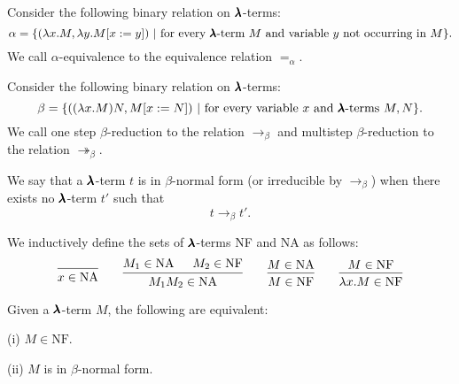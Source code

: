 \begin{definition}
  Consider the following binary relation on $\pmb{\lambda}$-terms:  
  \[
    \alpha = \{ (\lambda x . M, \lambda y . M[x := y]) \
                | \ \text{for every $\pmb{\lambda}$-term $M$ and variable $y$ not occurring in $M$} \}.
  \]  
  We call $\alpha$-equivalence to the equivalence relation $=_\alpha$.
\end{definition}


\begin{definition}
  \label{beta-reduction}
  Consider the following binary relation on $\pmb{\lambda}$-terms:  
  \[
    \beta = \{ ((\lambda x . M) N, M[x := N]) \
                | \ \text{for every variable $x$ and $\pmb{\lambda}$-terms $M, N$} \}.
  \]  
  We call one step $\beta$-reduction to the relation $\to_\beta$ and multistep $\beta$-reduction to the relation $\twoheadrightarrow_\beta$.
\end{definition}


\begin{definition}
  We say that a $\pmb{\lambda}$-term $t$ is in $\beta$-normal form (or irreducible by $\to_\beta$) when there exists no $\pmb{\lambda}$-term $t'$ such that
  \[ t \to_\beta t' . \]
\end{definition}


\begin{definition}%
  \label{beta_nfs}
  We inductively define the sets of $\pmb{\lambda}$-terms NF and NA as follows:
  \[
    \begin{prooftree}
      \infer0{ x \in \text{NA} } 
    \end{prooftree}
    \qquad
    \begin{prooftree}
      \hypo{ M_1 \in \text{NA} }
      \hypo{ M_2 \in \text{NF} }            
      \infer2{ M_1 M_2 \in \text{NA} } 
    \end{prooftree}
    \qquad
    \begin{prooftree}
      \hypo{ M \in \text{NA} }
      \infer1{ M \in \text{NF} } 
    \end{prooftree}
    \qquad
    \begin{prooftree}
      \hypo{ M \in \text{NF} }
      \infer1{ \lambda x . M \in \text{NF} } 
    \end{prooftree}
  \]
\end{definition}


\begin{claim}
  \label{beta_nfs_claim}
  Given a $\pmb{\lambda}$-term $M$, the following are equivalent:

  (i) $M \in \text{NF}$.

  (ii) $M$ is in $\beta$-normal form.
\end{claim}

